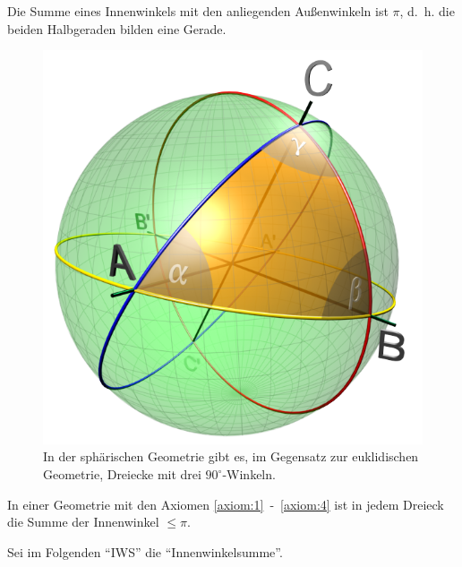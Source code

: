 \begin{beweis}
    Die Summe eines Innenwinkels mit den anliegenden Außenwinkeln ist
    $\pi$, d.~h. die beiden Halbgeraden bilden eine Gerade.
\end{beweis}

\begin{figure}[htp]
    \centering
    \includegraphics[width=0.4\linewidth, keepaspectratio]{figures/Spherical_triangle_3d_opti.png} 
    \caption{In der sphärischen Geometrie gibt es, im Gegensatz zur euklidischen Geometrie, Dreiecke mit drei $90^\circ$-Winkeln.}
    \label{fig:bem.14.9}
\end{figure}

\begin{proposition}\label{prop:14.11}%
    In einer Geometrie mit den Axiomen \ref{axiom:1}~-~\ref{axiom:4}
    ist in jedem Dreieck die Summe der Innenwinkel $\leq \pi$.
\end{proposition}

Sei im Folgenden \enquote{IWS} die \enquote{Innenwinkelsumme}.

